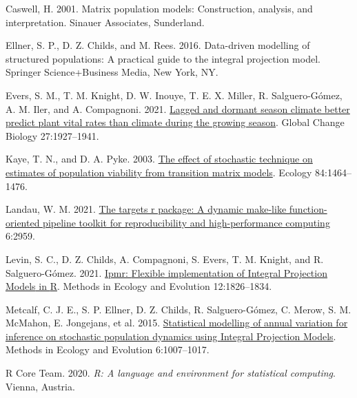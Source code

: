 \documentclass[
  12pt,
]{article}
\newlength{\cslhangindent}
\newlength{\cslentryspacingunit} %
\newenvironment{CSLReferences}[2] %
 {%
  \setlength{\parindent}{0pt}
  \ifodd #1
  \let\oldpar\par
  \def\par{\hangindent=\cslhangindent\oldpar}
  \fi
  \setlength{\parskip}{#2\cslentryspacingunit}
 }%
 {}
\begin{document}
\hypertarget{refs}{}
\begin{CSLReferences}{0}{0}
\leavevmode{}%
Caswell, H. 2001. Matrix population models: Construction, analysis, and
interpretation. Sinauer Associates, Sunderland.

\leavevmode{}%
Ellner, S. P., D. Z. Childs, and M. Rees. 2016. Data-driven modelling of
structured populations: A practical guide to the integral projection
model. {Springer Science+Business Media}, {New York, NY}.

\leavevmode{}%
Evers, S. M., T. M. Knight, D. W. Inouye, T. E. X. Miller, R.
Salguero-Gómez, A. M. Iler, and A. Compagnoni. 2021.
\href{https://doi.org/10.1111/gcb.15519}{Lagged and dormant season
climate better predict plant vital rates than climate during the growing
season}. Global Change Biology 27:1927--1941.

\leavevmode{}%
Kaye, T. N., and D. A. Pyke. 2003.
\href{https://doi.org/10.1890/0012-9658(2003)084\%5B1464:TEOSTO\%5D2.0.CO;2}{The
effect of stochastic technique on estimates of population viability from
transition matrix models}. Ecology 84:1464--1476.

\leavevmode{}%
Landau, W. M. 2021. \href{https://doi.org/10.21105/joss.02959}{The
targets r package: A dynamic make-like function-oriented pipeline
toolkit for reproducibility and high-performance computing} 6:2959.

\leavevmode{}%
Levin, S. C., D. Z. Childs, A. Compagnoni, S. Evers, T. M. Knight, and
R. Salguero-Gómez. 2021.
\href{https://doi.org/10.1111/2041-210X.13683}{Ipmr: {Flexible}
implementation of {Integral Projection Models} in {R}}. Methods in
Ecology and Evolution 12:1826--1834.

\leavevmode{}%
Metcalf, C. J. E., S. P. Ellner, D. Z. Childs, R. Salguero-Gómez, C.
Merow, S. M. McMahon, E. Jongejans, et al. 2015.
\href{https://doi.org/10.1111/2041-210X.12405}{Statistical modelling of
annual variation for inference on stochastic population dynamics using
{Integral Projection Models}}. Methods in Ecology and Evolution
6:1007--1017.

\leavevmode{}%
R Core Team. 2020. \emph{R: {A} language and environment for statistical
computing}. {Vienna, Austria}.


\end{CSLReferences}
\end{document}
